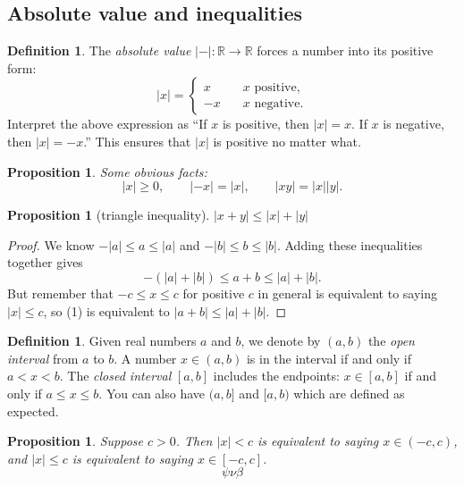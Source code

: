 \documentclass[11pt]{article}
\newtheorem{prop}[thm]{Proposition}
\theoremstyle{definition}
\newtheorem{definition}[thm]{Definition}
\theoremstyle{remark}
\begin{document}
\subsection{Absolute value and inequalities}

\begin{definition}
    The \emph{absolute value} $|-| : \mathbb{R} \to \mathbb{R}$ forces a number into its positive form:
    \[
    |x| = \begin{cases}x \quad& x \text{ positive,} \\ -x \quad& x \text{ negative.}\end{cases}
    \]
    Interpret the above expression as ``If $x$ is positive, then $|x| = x$. If $x$ is negative, then $|x| = -x$.'' This ensures that $|x|$ is positive no matter what.
\end{definition}

\begin{prop}
    Some obvious facts:
    \[
    |x| \geq 0, \qquad |-x| = |x|, \qquad |xy| = |x||y|.
    \]
\end{prop}

\begin{prop}[triangle inequality]
    $|x + y| \leq |x| + |y|$
\end{prop}

\begin{proof}
    We know $-|a| \leq a \leq |a|$ and $-|b| \leq b \leq |b|$. Adding these inequalities together gives
    \begin{equation}
        -(|a| + |b|) \leq a + b \leq |a| + |b|.
    \end{equation}
    But remember that $-c \leq x \leq c$ for positive $c$ in general is equivalent to saying $|x| \leq c$, so (1) is equivalent to $|a + b| \leq |a| + |b|$.
\end{proof}

\begin{definition}
    Given real numbers $a$ and $b$, we denote by $(a, b)$ the \emph{open interval} from $a$ to $b$. A number $x \in (a, b)$ is in the interval if and only if $a < x < b$. The \emph{closed interval} $[a, b]$ includes the endpoints: $x \in [a, b]$ if and only if $a \leq x \leq b$. You can also have $(a, b]$ and $[a, b)$ which are defined as expected.
\end{definition}

\begin{prop}
    Suppose $c > 0$. Then $|x| < c$ is equivalent to saying $x \in (-c, c)$, and $|x| \leq c$ is equivalent to saying $x \in [-c, c]$.
    \[
    \psi\nu\beta
    \]
\end{prop}
\end{document}
